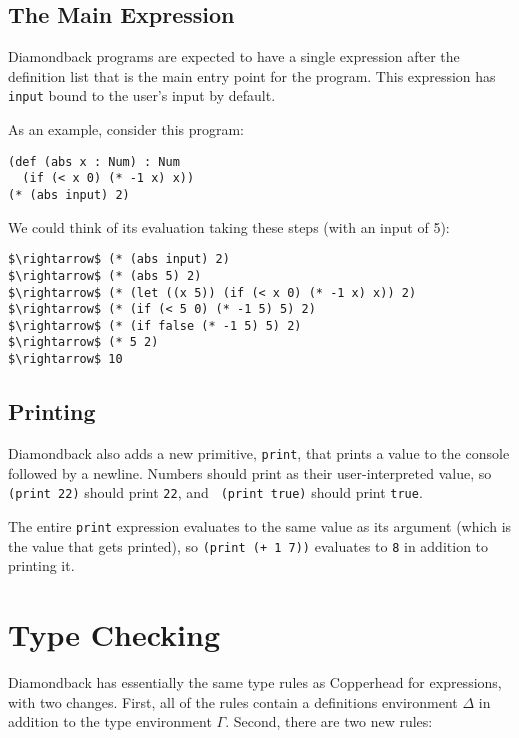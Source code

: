 \documentclass[10pt, oneside]{article}
\begin{document}
\subsection*{The Main Expression}

Diamondback programs are expected to have a single expression after the
definition list that is the main entry point for the program. This expression
has {\tt input} bound to the user's input by default.

As an example, consider this program:

\begin{lstlisting}
(def (abs x : Num) : Num
  (if (< x 0) (* -1 x) x))
(* (abs input) 2)
\end{lstlisting}

We could think of its evaluation taking these steps (with an input of 5):

\begin{lstlisting}
$\rightarrow$ (* (abs input) 2)
$\rightarrow$ (* (abs 5) 2)
$\rightarrow$ (* (let ((x 5)) (if (< x 0) (* -1 x) x)) 2)
$\rightarrow$ (* (if (< 5 0) (* -1 5) 5) 2)
$\rightarrow$ (* (if false (* -1 5) 5) 2)
$\rightarrow$ (* 5 2)
$\rightarrow$ 10
\end{lstlisting}

\subsection*{Printing}

Diamondback also adds a new primitive, {\tt print}, that prints a value to
the console followed by a newline. Numbers should print as their
user-interpreted value, so {\tt (print 22)} should print {\tt 22}, and {\tt
(print true)} should print {\tt true}.

The entire {\tt print} expression evaluates to the same value as its argument
(which is the value that gets printed), so {\tt (print (+ 1 7))} evaluates to
{\tt 8} in addition to printing it.

\section*{Type Checking}

Diamondback has essentially the same type rules as Copperhead for
expressions, with two changes. First, all of the rules contain a definitions
environment $\Delta$ in addition to the type environment $\Gamma$. Second,
there are two new rules:

\end{document}

